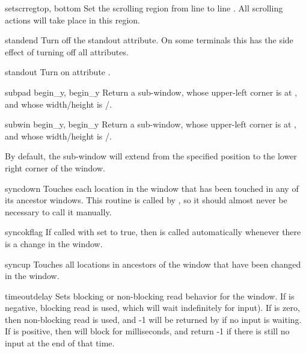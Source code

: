 \begin{methoddesc}{setscrreg}{top, bottom}
Set the scrolling region from line  to line . All
scrolling actions will take place in this region.
\end{methoddesc}

\begin{methoddesc}{standend}{}
Turn off the standout attribute.  On some terminals this has the
side effect of turning off all attributes.
\end{methoddesc}

\begin{methoddesc}{standout}{}
Turn on attribute .
\end{methoddesc}

\begin{methoddesc}{subpad}{ begin_y, begin_y}
Return a sub-window, whose upper-left corner is at
, and whose width/height is
/.
\end{methoddesc}

\begin{methoddesc}{subwin}{ begin_y, begin_y}
Return a sub-window, whose upper-left corner is at
, and whose width/height is
/.

By default, the sub-window will extend from the
specified position to the lower right corner of the window.
\end{methoddesc}

\begin{methoddesc}{syncdown}{}
Touches each location in the window that has been touched in any of
its ancestor windows.  This routine is called by ,
so it should almost never be necessary to call it manually.
\end{methoddesc}

\begin{methoddesc}{syncok}{flag}
If called with  set to true, then  is
called automatically whenever there is a change in the window.
\end{methoddesc}

\begin{methoddesc}{syncup}{}
Touches all locations in ancestors of the window that have been changed in 
the window.  
\end{methoddesc}

\begin{methoddesc}{timeout}{delay}
Sets blocking or non-blocking read behavior for the window.  If
 is negative, blocking read is used, which will wait
indefinitely for input).  If  is zero, then non-blocking
read is used, and -1 will be returned by  if no input
is waiting.  If  is positive, then  will
block for  milliseconds, and return -1 if there is still no
input at the end of that time.
\end{methoddesc}

